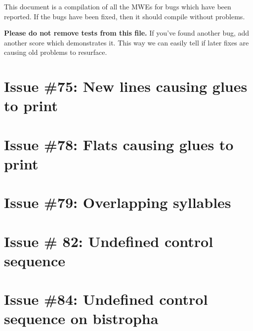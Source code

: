 \documentclass[11pt]{article}
\begin{document}
This document is a compilation of all the MWEs for bugs which have been reported.  If the bugs have been fixed, then it should compile without problems.

\textbf{Please do not remove tests from this file.}  If you've found another bug, add another score which demonstrates it.  This way we can easily tell if later fixes are causing old problems to resurface.

\section{Issue \#75: New lines causing glues to print}




\section{Issue \#78: Flats causing glues to print}

\section{Issue \#79: Overlapping syllables}

\section{Issue \# 82: Undefined control sequence}

\section{Issue \#84: Undefined control sequence on bistropha}
\end{document}

